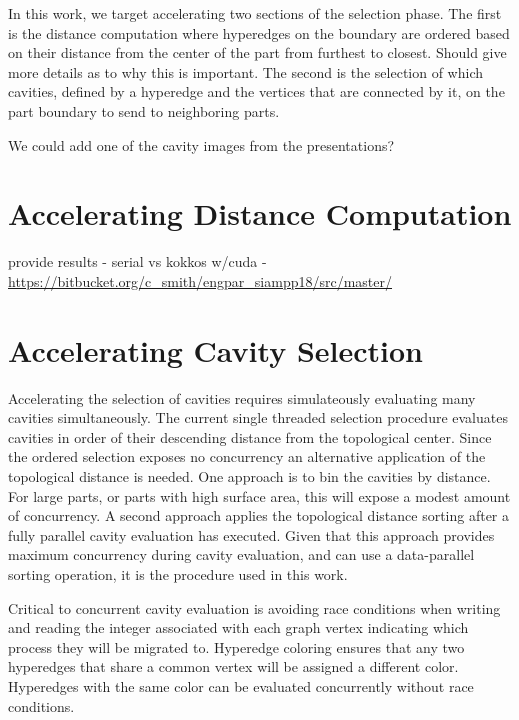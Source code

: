 \documentclass[graybox]{svmult}
\begin{document}
In this work, we target accelerating two sections of the selection phase. The first is
the distance computation where hyperedges on the boundary are ordered based on their
distance from the center of the part from furthest to closest.
{\color{red}Should give more details as to why this is important.}
The second is the selection of which cavities, defined by a hyperedge and the
vertices that are connected by it, on the part boundary to send to neighboring parts.

{\color{red} We could add one of the cavity images from the presentations?}


\section{Accelerating Distance Computation} \label{sec:dist}

provide results - serial vs kokkos w/cuda -
\url{https://bitbucket.org/c_smith/engpar_siampp18/src/master/}

\section{Accelerating Cavity Selection} \label{sec:select}

Accelerating the selection of cavities requires simulateously evaluating many
cavities simultaneously.
The current single threaded selection procedure evaluates cavities in order of
their descending distance from the topological center.
Since the ordered selection exposes no concurrency an alternative application of
the topological distance is needed.
One approach is to bin the cavities by distance.
For large parts, or parts with high surface area, this will expose a modest
amount of concurrency.
A second approach applies the topological distance sorting after a fully
parallel cavity evaluation has executed.
Given that this approach provides maximum concurrency during cavity evaluation,
and can use a data-parallel sorting operation, it is the procedure used in this
work.

Critical to concurrent cavity evaluation is avoiding race conditions when
writing and reading the integer associated with each graph vertex indicating
which process they will be migrated to.
Hyperedge coloring ensures that any two hyperedges that share a common vertex
will be assigned a different color.
Hyperedges with the same color can be evaluated concurrently without
race conditions.
\end{document}
